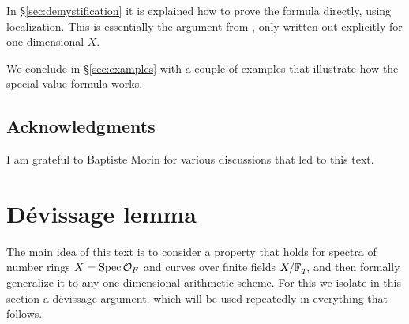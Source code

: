 \documentclass[draft]{article}
\numberwithin{equation}{section}
\begin{document}
In \S\ref{sec:demystification} it is explained how to prove the formula
directly, using localization. This is essentially the argument from
\cite{Beshenov-Weil-etale-2}, only written out explicitly for one-dimensional
$X$.

We conclude in \S\ref{sec:examples} with a couple of examples that illustrate
how the special value formula works.

\subsection*{Acknowledgments}

I am grateful to Baptiste Morin for various discussions that led to this text.


\section{D\'{e}vissage lemma}
\label{sec:devissage}

The main idea of this text is to consider a property that holds for spectra of
number rings $X = \operatorname{Spec} \mathcal{O}_F$ and curves over finite fields $X/\mathbb{F}_q$,
and then formally generalize it to any one-dimensional arithmetic scheme.
For this we isolate in this section a d\'{e}vissage argument, which will be used
repeatedly in everything that follows.
\end{document}
